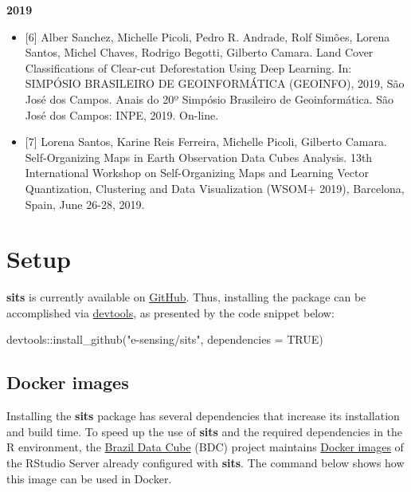 \documentclass[a4paper,]{tufte-book}
\newenvironment{Shaded}{}{}
\newcommand{\AttributeTok}[1]{\textcolor[rgb]{0.49,0.56,0.16}{#1}}
\newcommand{\ConstantTok}[1]{\textcolor[rgb]{0.53,0.00,0.00}{#1}}
\newcommand{\FunctionTok}[1]{\textcolor[rgb]{0.02,0.16,0.49}{#1}}
\newcommand{\NormalTok}[1]{#1}
\newcommand{\SpecialCharTok}[1]{\textcolor[rgb]{0.25,0.44,0.63}{#1}}
\newcommand{\StringTok}[1]{\textcolor[rgb]{0.25,0.44,0.63}{#1}}
\begin{document}
\textbf{2019}

\begin{itemize}
\item
  {[}6{]} Alber Sanchez, Michelle Picoli, Pedro R. Andrade, Rolf Simões, Lorena Santos, Michel Chaves, Rodrigo Begotti, Gilberto Camara. Land Cover Classifications of Clear-cut Deforestation Using Deep Learning. In: SIMPÓSIO BRASILEIRO DE GEOINFORMÁTICA (GEOINFO), 2019, São José dos Campos. Anais do 20º Simpósio Brasileiro de Geoinformática. São José dos Campos: INPE, 2019. On-line.
\item
  {[}7{]} Lorena Santos, Karine Reis Ferreira, Michelle Picoli, Gilberto Camara. Self-Organizing Maps in Earth Observation Data Cubes Analysis. 13th International Workshop on Self-Organizing Maps and Learning Vector Quantization, Clustering and Data Visualization (WSOM+ 2019), Barcelona, Spain, June 26-28, 2019.
\end{itemize}

\hypertarget{setup}{%
\chapter*{Setup}\label{setup}}

\textbf{sits} is currently available on \href{https://github.com/e-sensing/sits}{GitHub}. Thus, installing the package can be accomplished via \href{https://cran.r-project.org/web/packages/devtools/index.html}{devtools}, as presented by the code snippet below:

\begin{Shaded}
\begin{Highlighting}[]
\NormalTok{devtools}\SpecialCharTok{::}\FunctionTok{install\_github}\NormalTok{(}\StringTok{"e{-}sensing/sits"}\NormalTok{, }\AttributeTok{dependencies =} \ConstantTok{TRUE}\NormalTok{)}
\end{Highlighting}
\end{Shaded}

\hypertarget{docker-images}{%
\section*{Docker images}\label{docker-images}}

Installing the \textbf{sits} package has several dependencies that increase its installation and build time. To speed up the use of \textbf{sits} and the required dependencies in the R environment, the \href{https://github.com/brazil-data-cube}{Brazil Data Cube} (BDC) project maintains \href{https://hub.docker.com/r/brazildatacube/sits-rstudio}{Docker images} of the RStudio Server already configured with \textbf{sits}. The command below shows how this image can be used in Docker.
\end{document}

